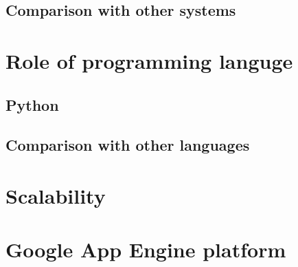 \subsection{Comparison with other systems}\label{subsec:dvcs_compare}

\section{Role of programming languge}\label{sec:language}
\subsection{Python}\label{subsec:py}
\subsection{Comparison with other languages}\label{subsec:lang_compare}
\section{Scalability}\label{sec:scalability}
\section{Google App Engine platform}\label{sec:gae}